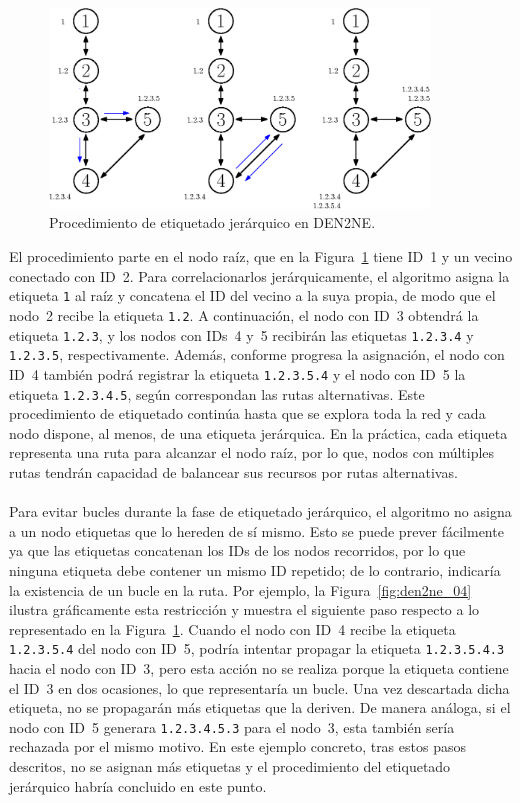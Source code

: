 \begin{figure}[ht!]
    \centering
    \includegraphics[width=0.9\textwidth]{fig/05_den2ne/den2ne_03.eps}
    \caption{Procedimiento de etiquetado jerárquico en DEN2NE.}
    \label{fig:den2ne_03}
\end{figure}

El procedimiento parte en el nodo raíz, que en la Figura~\ref{fig:den2ne_03} tiene ID~1 y un vecino conectado con ID~2. Para correlacionarlos jerárquicamente, el algoritmo asigna la etiqueta \texttt{1} al raíz y concatena el ID del vecino a la suya propia, de modo que el nodo~2 recibe la etiqueta \texttt{1.2}. A continuación, el nodo con ID~3 obtendrá la etiqueta \texttt{1.2.3}, y los nodos con IDs~4 y~5 recibirán las etiquetas \texttt{1.2.3.4} y \texttt{1.2.3.5}, respectivamente. Además, conforme progresa la asignación, el nodo con ID~4 también podrá registrar la etiqueta \texttt{1.2.3.5.4} y el nodo con ID~5 la etiqueta \texttt{1.2.3.4.5}, según correspondan las rutas alternativas. Este procedimiento de etiquetado continúa hasta que se explora toda la red y cada nodo dispone, al menos, de una etiqueta jerárquica. En la práctica, cada etiqueta representa una ruta para alcanzar el nodo raíz, por lo que, nodos con múltiples rutas tendrán capacidad de balancear sus recursos por rutas alternativas.\\
\\
Para evitar bucles durante la fase de etiquetado jerárquico, el algoritmo no asigna a un nodo etiquetas que lo hereden de sí mismo. Esto se puede prever fácilmente ya que las etiquetas concatenan los IDs de los nodos recorridos, por lo que ninguna etiqueta debe contener un mismo ID repetido; de lo contrario, indicaría la existencia de un bucle en la ruta. Por ejemplo, la Figura~\ref{fig:den2ne_04} ilustra gráficamente esta restricción y muestra el siguiente paso respecto a lo representado en la Figura~\ref{fig:den2ne_03}. Cuando el nodo con ID~4 recibe la etiqueta \texttt{1.2.3.5.4} del nodo con ID~5, podría intentar propagar la etiqueta \texttt{1.2.3.5.4.3} hacia el nodo con ID~3, pero esta acción no se realiza porque la etiqueta contiene el ID~3 en dos ocasiones, lo que representaría un bucle. Una vez descartada dicha etiqueta, no se propagarán más etiquetas que la deriven. De manera análoga, si el nodo con ID~5 generara \texttt{1.2.3.4.5.3} para el nodo~3, esta también sería rechazada por el mismo motivo. En este ejemplo concreto, tras estos pasos descritos, no se asignan más etiquetas y el procedimiento del etiquetado jerárquico habría concluido en este punto.



